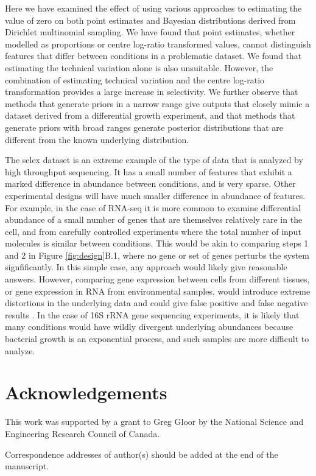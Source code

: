 \documentclass[article]{ajs}\usepackage[]{graphicx}\usepackage[]{color}
\begin{document}
Here we have examined the effect of using various approaches to estimating the value of zero on both point estimates and Bayesian distributions derived from Dirichlet multinomial sampling. We have found that point estimates, whether modelled as proportions or centre log-ratio transformed values,  cannot distinguish features that differ between conditions in a problematic dataset. We found that estimating the technical variation alone is also unsuitable. However, the combination of estimating technical variation and the centre log-ratio transformation provides a large increase in selectivity. We further observe that methods that  generate priors in a narrow range give outputs that closely mimic a dataset derived from a differential growth experiment, and that methods that generate priors with broad ranges generate posterior distributions that are different from the known underlying distribution.

The selex dataset is an extreme example of the type of data that is  analyzed by high throughput sequencing. It has a small number of features that exhibit a marked difference in abundance between conditions, and is very sparse. Other experimental designs will have much smaller difference in abundance of features. For example, in the case of  RNA-seq it is more common to examine differential abundance of a small number of genes that are themselves relatively rare in the cell, and from carefully controlled experiments where the total number of input molecules is similar between conditions. This would be akin to comparing steps 1 and 2 in Figure \ref{fig:design}B.1, where no gene or set of genes perturbs the system signfificantly. In this simple case, any approach would likely give reasonable answers. However, comparing gene expression between cells from different tissues, or gene expression in RNA from environmental samples, would introduce  extreme distortions in the underlying data and could give false positive and false negative results \citep{fernandes:2013,macklaim:2013,fernandes:2014}. In the case of 16S rRNA gene sequencing experiments, it is likely that many conditions would have wildly divergent underlying abundances because bacterial growth is an exponential process, and such samples are more difficult to analyze. 

\section*{Acknowledgements}
\vskip-0.25cm
This work was supported by a grant to Greg Gloor by the National Science and Engineering Research Council of Canada.  


Correspondence addresses of author(s) should be added at the end
of the manuscript. 



%

\end{document}
